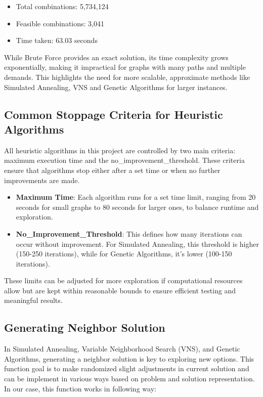\documentclass[a4paper,12pt]{article}
\begin{document}
\begin{itemize}
    \item Total combinations: 5,734,124
    \item Feasible combinations: 3,041
    \item Time taken: 63.03 seconds
\end{itemize}

\noindent  While Brute Force provides an exact solution, its time complexity grows exponentially, making it impractical for graphs with many paths and multiple demands. This highlights the need for more scalable, approximate methods like Simulated Annealing, VNS and Genetic Algorithms for larger instances.

\subsection{Common Stoppage Criteria for Heuristic Algorithms}

All heuristic algorithms in this project are controlled by two main criteria: maximum execution time and the no\_improvement\_threshold. These criteria ensure that algorithms stop either after a set time or when no further improvements are made.

\begin{itemize}
    \item \textbf{Maximum Time}: Each algorithm runs for a set time limit, ranging from 20 seconds for small graphs to 80 seconds for larger ones, to balance runtime and exploration.
    \item \textbf{No\_Improvement\_Threshold}: This defines how many iterations can occur without improvement. For Simulated Annealing, this threshold is higher (150-250 iterations), while for Genetic Algorithms, it’s lower (100-150 iterations).
\end{itemize}

\noindent These limits can be adjusted for more exploration if computational resources allow but are kept within reasonable bounds to ensure efficient testing and meaningful results.


\subsection{Generating Neighbor Solution}

In Simulated Annealing, Variable Neighborhood Search (VNS), and Genetic Algorithms, generating a neighbor solution is key to exploring new options. This function goal is to make randomized slight adjustments in current solution and can be implement in various ways based on problem and solution representation. In our case, this function works in following way:
\end{document}
